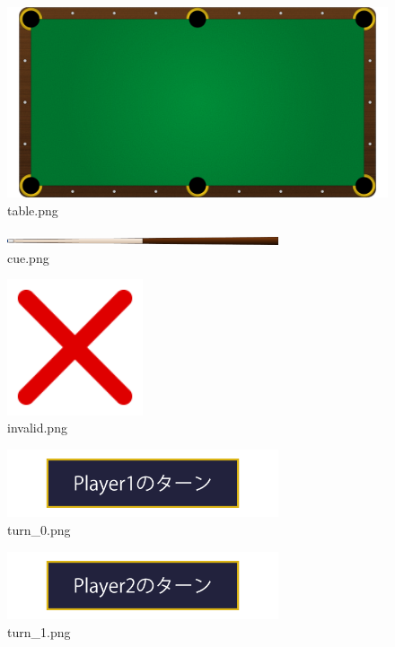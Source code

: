 \documentclass[a4j,titlepage]{jsarticle}
\begin{document}
\begin{figure}[H]
  \centering
  \includegraphics[width=12cm]{../images/table.png}
  \caption{table.png}
  \label{fig:table}
\end{figure}

\begin{figure}[H]
  \centering
  \includegraphics[width=8cm]{../images/cue.png}
  \caption{cue.png}
  \label{fig:cue}
\end{figure}

\begin{figure}[H]
  \centering
  \includegraphics[width=4cm]{../images/invalid.png}
  \caption{invalid.png}
  \label{fig:invalid}
\end{figure}

\begin{figure}[H]
  \centering
  \includegraphics[width=8cm]{../images/turn_0.png}
  \caption{turn\_0.png}
  \label{fig:turn_0}
\end{figure}

\begin{figure}[H]
  \centering
  \includegraphics[width=8cm]{../images/turn_1.png}
  \caption{turn\_1.png}
  \label{fig:turn_1}
\end{figure}
\end{document}
